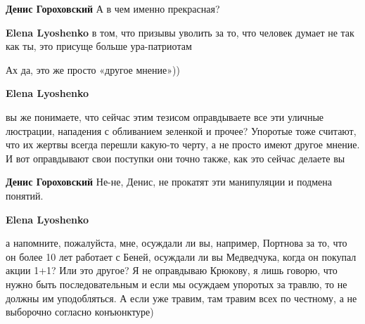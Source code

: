 \begin{itemize}
\begin{itemize}
\textbf{Денис Гороховский}
А в чем именно прекрасная?

 

\textbf{Elena Lyoshenko} в том, что призывы уволить за то, что человек думает не так как ты, это присуще больше ура-патриотам

 

Ах да, это же просто «другое мнение»))

 

\textbf{Elena Lyoshenko} 

вы же понимаете, что сейчас этим тезисом оправдываете все эти уличные
люстрации, нападения с обливанием зеленкой и прочее? Упоротые тоже считают, что
их жертвы всегда перешли какую-то черту, а не просто имеют другое мнение. И вот
оправдывают свои поступки они точно также, как это сейчас делаете вы

 

\textbf{Денис Гороховский}
Не-не, Денис, не прокатят эти манипуляции и подмена понятий.

 

\textbf{Elena Lyoshenko} 

а напомните, пожалуйста, мне, осуждали ли вы, например, Портнова за то, что он
более 10 лет работает с Беней, осуждали ли вы Медведчука, когда он покупал
акции 1+1? Или это другое? Я не оправдываю Крюкову, я лишь говорю, что нужно
быть последовательным и если мы осуждаем упоротых за травлю, то не должны им
уподобляться. А если уже травим, там травим всех по честному, а не выборочно
согласно конъюнктуре)


\end{itemize}
\end{itemize}
